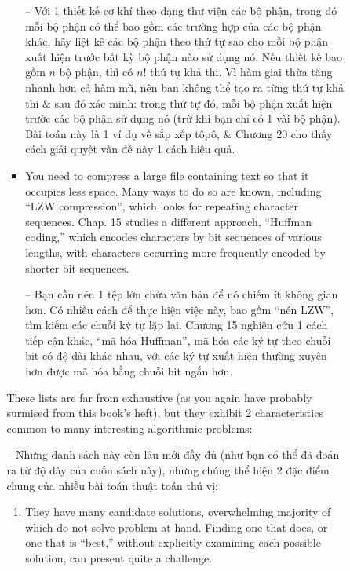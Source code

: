 \documentclass{article}
\begin{document}
\begin{itemize}
\begin{itemize}
\begin{itemize}
\begin{itemize}
                -- Với 1 thiết kế cơ khí theo dạng thư viện các bộ phận, trong đó mỗi bộ phận có thể bao gồm các trường hợp của các bộ phận khác, hãy liệt kê các bộ phận theo thứ tự sao cho mỗi bộ phận xuất hiện trước bất kỳ bộ phận nào sử dụng nó. Nếu thiết kế bao gồm $n$ bộ phận, thì có $n!$ thứ tự khả thi. Vì hàm giai thừa tăng nhanh hơn cả hàm mũ, nên bạn không thể tạo ra từng thứ tự khả thi \& sau đó xác minh: trong thứ tự đó, mỗi bộ phận xuất hiện trước các bộ phận sử dụng nó (trừ khi bạn chỉ có 1 vài bộ phận). Bài toán này là 1 ví dụ về sắp xếp tôpô, \& Chương 20 cho thấy cách giải quyết vấn đề này 1 cách hiệu quả.
                \item You need to compress a large file containing text so that it occupies less space. Many ways to do so are known, including ``LZW compression'', which looks for repeating character sequences. Chap. 15 studies a different approach, ``Huffman coding,'' which encodes characters by bit sequences of various lengths, with characters occurring more frequently encoded by shorter bit sequences.
                
                -- Bạn cần nén 1 tệp lớn chứa văn bản để nó chiếm ít không gian hơn. Có nhiều cách để thực hiện việc này, bao gồm ``nén LZW'', tìm kiếm các chuỗi ký tự lặp lại. Chương 15 nghiên cứu 1 cách tiếp cận khác, ``mã hóa Huffman'', mã hóa các ký tự theo chuỗi bit có độ dài khác nhau, với các ký tự xuất hiện thường xuyên hơn được mã hóa bằng chuỗi bit ngắn hơn.
            \end{itemize}
            These lists are far from exhaustive (as you again have probably surmised from this book's heft), but they exhibit 2 characteristics common to many interesting algorithmic problems:
            
            -- Những danh sách này còn lâu mới đầy đủ (như bạn có thể đã đoán ra từ độ dày của cuốn sách này), nhưng chúng thể hiện 2 đặc điểm chung của nhiều bài toán thuật toán thú vị:
            \begin{enumerate}
                \item They have many candidate solutions, overwhelming majority of which do not solve problem at hand. Finding one that does, or one that is ``best,'' without explicitly examining each possible solution, can present quite a challenge.
                

\end{enumerate}
\end{itemize}
\end{itemize}
\end{itemize}
\end{document}
